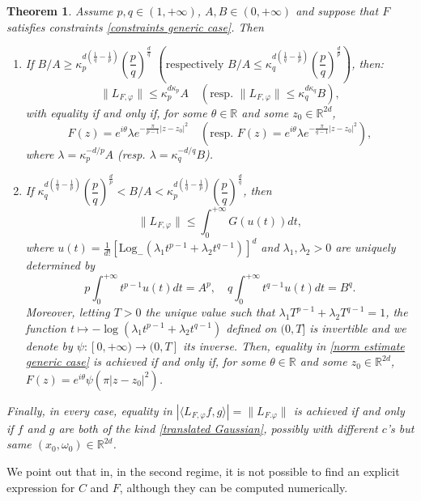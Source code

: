 \documentclass[corpo=11pt, stile=classica, tipotesi=custom,
greek, evenboxes, english]{toptesi}
\numberwithin{equation}{chapter}
\newtheorem{teo}{Theorem}[chapter] %
\theoremstyle{definition}
\theoremstyle{remark}
\newcommand{\R}{\mathbb{R}} %
\newcommand{\Log}{\ensuremath{\mathrm{Log}_-}}
\begin{document}
\begin{teo}\label{main theorem}
	Assume $p,q \in (1,+\infty)$, $A,B \in (0, +\infty)$ and suppose that $F$ satisfies constraints \eqref{constraints generic case}. Then
	\begin{enumerate}[label=(\roman*)]
		\item\label{main theorem i} If $B/A \geq \kappa_p^{d(\frac{1}{q}-\frac{1}{p})} \left(\dfrac{p}{q}\right)^{\frac{d}{q}}$ $\left(\text{respectively\ } B/A \leq \kappa_q^{d(\frac{1}{q}-\frac{1}{p})} \left(\dfrac{p}{q}\right)^{\frac{d}{p}}\right)$, then:
		\begin{equation*}
			\|L_{F,\varphi}\| \leq \kappa_p^{d \kappa_p} A \quad (\text{resp.\ } \|L_{F,\varphi}\| \leq \kappa_q^{d \kappa_q} B),
		\end{equation*}
		with equality if and only if, for some $\theta \in \R$ and some $z_0 \in \R^{2d}$,
		\begin{equation*}
			F(z) = e^{i \theta} \lambda e^{-\frac{\pi}{p-1}|z-z_0|^2} \quad (\text{resp.\ } F(z) = e^{i \theta} \lambda e^{-\frac{\pi}{q-1}|z-z_0|^2}),
		\end{equation*}
		where $\lambda = \kappa_p^{-d/p}A$ (resp. $\lambda = \kappa_q^{-d/q}B$).
		\item\label{main theorem ii} If $\kappa_q^{d(\frac{1}{q}-\frac{1}{p})} \left(\dfrac{p}{q}\right)^{\frac{d}{p}} < B/A < \kappa_p^{d(\frac{1}{q}-\frac{1}{p})} \left(\dfrac{p}{q}\right)^{\frac{d}{q}}$, then
		\begin{equation}\label{norm estimate generic case}
			\|L_{F,\varphi}\| \leq \int_0^{+\infty} G(u(t)) dt,
		\end{equation}
		where $u(t) = \frac{1}{d!} \left[ \Log (\lambda_1 t^{p-1} + \lambda_2 t^{q-1})\right]^d$ and $\lambda_1, \lambda_2 > 0$ are uniquely determined by
		\begin{equation*}
			p \int_0^{+\infty} t^{p-1} u(t) dt = A^p, \quad q \int_0^{+\infty} t^{q-1} u(t) dt = B^q.
		\end{equation*}
		Moreover, letting $T > 0$ the unique value such that $\lambda_1 T^{p-1} + \lambda_2 T^{q-1} = 1$, the function $t \mapsto -\log(\lambda_1 t^{p-1} + \lambda_2 t^{q-1})$ defined on $(0,T]$ is invertible and we denote by $\psi : [0, +\infty) \rightarrow (0,T]$ its inverse. Then, equality in \eqref{norm estimate generic case} is achieved if and only if, for some $\theta \in \R$ and some $z_0 \in \R^{2d}$, $F(z) = e^{i \theta} \psi(\pi |z-z_0|^2)$.
	\end{enumerate}
	Finally, in every case, equality in $|\langle L_{F, \varphi} f, g \rangle| = \|L_{F. \varphi}\|$ is achieved if and only if $f$ and $g$ are both of the kind \eqref{translated Gaussian}, possibly with different $c$'s but same $(x_0, \omega_0) \in \R^{2d}$.
\end{teo}
We point out that in, in the second regime, it is not possible to find an explicit expression for $C$ and $F$, although they can be computed numerically.
\end{document}
